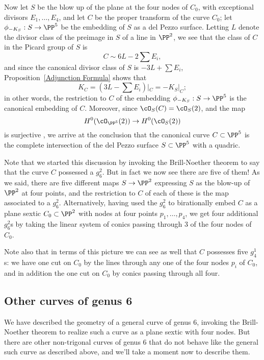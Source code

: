 Now let $S$ be the blow up of the plane at the four nodes of $C_0$, with exceptional divisors $E_1, \dots, E_4$, and let $C$ be the proper transform of the curve $C_0$; let $\phi_{-K_S} : S \to \PP^5$ be the embedding of $S$ as a del Pezzo surface. Letting $L$ denote the divisor class of the preimage in $S$ of a line in $\PP^2$, we see that the class of $C$ in the Picard group of $S$ is
$$
C \sim 6L - 2\sum E_i,
$$ 
and since the canonical divisor class of $S$ is $-3L + \sum E_i$,  Proposition~\ref{Adjunction Formula} shows that
$$
K_C = (3L - \sum E_i)|_C = -K_S|_C;
$$ 
in other words, the restriction to $C$ of the embedding $\phi_{-K_S} : S \to \PP^5$ is the canonical embedding of $C$. Moreover, since $\cO_S(C) = \cO_S(2)$, and the map 
$$
H^0(\cO_{\PP^5}(2)) \to H^0(\cO_S(2))
$$
is surjective , we arrive at the conclusion that the canonical curve $C \subset \PP^5$ is the complete intersection of the del Pezzo surface $S \subset \PP^5$ with a quadric.

Note that we started this discussion by invoking the Brill-Noether theorem to say that the curve $C$ possessed a $g^2_6$. But in fact we now see there are five of them! As we said, there are five different maps $S \to \PP^2$ expressing $S$ as the blow-up of $\PP^2$ at four points, and the restriction to $C$ of each of these is the map associated to a $g^2_6$. Alternatively, having used the $g^2_6$ to birationally embed $C$ as a plane sextic $C_0 \subset \PP^2$ with nodes at four points $p_1,\dots,p_4$, we get four additional $g^2_6$s by taking the linear system of conics passing through 3 of the four nodes of $C_0$.

Note also that in terms of this picture we can see as well that $C$ possesses five $g^1_4$s: we have one cut on $C_0$ by the lines through any one of the four nodes $p_i$ of $C_0$, and in addition the one cut on $C_0$ by conics passing through all four.

\subsection{Other curves of genus 6}

We have described the geometry of a general curve of genus 6, invoking the Brill-Noether theorem to realize such a curve as a plane sextic with four nodes. But there are other non-trigonal curves of genus 6 that do not behave like the general such curve as described above, and we'll take a moment now to describe them.

